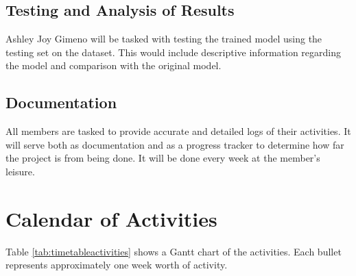 \subsection{Testing and Analysis of Results}
Ashley Joy Gimeno will be tasked with testing the trained model using the testing set on the dataset. This would include descriptive information regarding the model and comparison with the original model.

\subsection{Documentation}
All members are tasked to provide accurate and detailed logs of their activities. It will serve both as documentation and as a progress tracker to determine how far the project is from being done. It will be done every week at the member’s leisure.


\section{Calendar of Activities}

	Table \ref{tab:timetableactivities} shows a Gantt chart of the activities.  Each bullet represents approximately
	one week worth of activity.
	
	\newcommand{\weekone}{\textbullet}
	\newcommand{\weektwo}{\textbullet \textbullet}
	\newcommand{\weekthree}{\textbullet \textbullet \textbullet}
	\newcommand{\weekfour}{\textbullet \textbullet \textbullet \textbullet}
	
